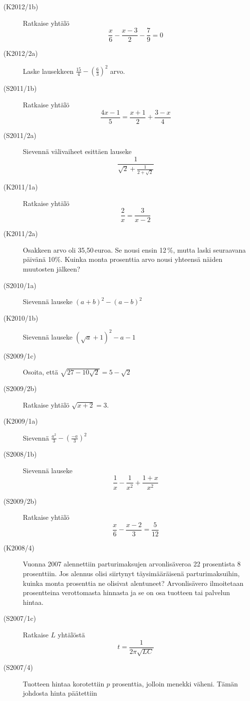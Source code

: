 \begin{description}

    \item[(K2012/1b)]  Ratkaise yhtälö
                           \[\frac{x}{6} - \frac{x-3}{2} - \frac{7}{9} = 0 \]
    \item[(K2012/2a)]  Laske lausekkeen $ \frac{15}{4} - \left( \frac{6}{3} \right)^2 $ arvo.
    \item[(S2011/1b)]  Ratkaise yhtälö
                           \[ \frac{4x - 1}{5} = \frac{x + 1}{2} + \frac{3 - x}{4} \]
    \item[(S2011/2a)]  Sievennä välivaiheet esittäen lauseke \[ \frac{1}{\sqrt{2} + \frac{1}{2 + \sqrt{2}}} \]
    \item[(K2011/1a)]  Ratkaise yhtälö
                           \[ \frac{2}{x} = \frac{3}{x - 2} \]
    \item[(K2011/2a)]  Osakkeen arvo oli 35,50\,euroa. Se nousi ensin 12\,\%, mutta laski seuraavana päivänä 10\%.
                       Kuinka monta prosenttia arvo nousi yhteensä näiden muutosten jälkeen?
    \item[(S2010/1a)]  Sievennä lauseke $ (a + b)^2 - (a - b)^2 $
    \item[(K2010/1b)]  Sievennä lauseke $ (\sqrt{a} + 1)^2 - a - 1 $
    \item[(S2009/1c)]  Osoita, että $ \sqrt{27 - 10 \sqrt{ 2} } = 5 - \sqrt{2} $
    \item[(S2009/2b)]  Ratkaise yhtälö $ \sqrt{x + 2 } = 3  $.
    \item[(K2009/1a)]  Sievennä $ \frac{a^2}{3} - \left( \frac{-a}{3} \right)^2 $
    \item[(S2008/1b)]  Sievennä lauseke
                           \[ \frac{1}{x} - \frac{1}{x^2} + \frac{1 + x}{x^2} \]
    \item[(S2009/2b)]  Ratkaise yhtälö
                           \[ \frac{x}{6} - \frac{x - 2}{3} = \frac{5}{12} \]
    \item[(K2008/4)]   Vuonna 2007 alennettiin parturimaksujen arvonlisäveroa 22 prosentista 8 prosenttiin. Jos alennus olisi
                       siirtynyt täysimääräisenä parturimaksuihin, kuinka monta prosenttia ne olisivat alentuneet?
                       Arvonlisävero ilmoitetaan prosentteina verottomasta hinnasta ja se on osa tuotteen tai palvelun hintaa.
    \item[(S2007/1c)]  Ratkaise $L$ yhtälöstä
                           \[ t = \frac{1}{2\pi\sqrt{LC}} \]
    \item[(S2007/4)]   Tuotteen hintaa korotettiin $p$ prosenttia, jolloin menekki väheni. Tämän johdosta hinta päätettiin

\end{description}
